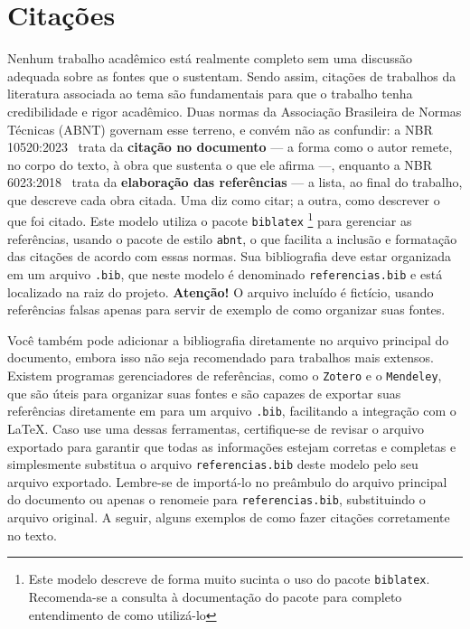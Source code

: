 \section{Citações}\label{sec:citacoes}

Nenhum trabalho acadêmico está realmente completo sem uma discussão adequada sobre as fontes que o
sustentam. Sendo assim, citações de trabalhos da literatura associada ao tema são fundamentais para
que o trabalho tenha credibilidade e rigor acadêmico. Duas normas da Associação Brasileira de Normas
Técnicas (ABNT) governam esse terreno, e convém não as confundir: a NBR
10520:2023~\cite{nbr10520:2023} trata da \textbf{citação no documento} --- a forma como o autor
remete, no corpo do texto, à obra que sustenta o que ele afirma ---, enquanto a NBR
6023:2018~\cite{nbr6023:2018} trata da \textbf{elaboração das referências} --- a lista, ao final do
trabalho, que descreve cada obra citada. Uma diz como citar; a outra, como descrever o que foi
citado. Este modelo utiliza o pacote \texttt{biblatex}%
%
\footnote{Este modelo descreve de forma muito sucinta o uso do pacote \texttt{biblatex}.
    Recomenda-se a consulta à documentação do pacote para completo entendimento de como utilizá-lo}%
%
 para gerenciar as referências, usando o pacote de estilo \texttt{abnt}, o que facilita a inclusão e
formatação das citações de acordo com essas normas. Sua bibliografia deve estar organizada em um
arquivo \texttt{.bib}, que neste modelo é denominado \texttt{referencias.bib} e está localizado na
raiz do projeto. \textbf{Atenção!}  O arquivo incluído é fictício, usando referências falsas apenas
para servir de exemplo de como organizar suas fontes.

Você também pode adicionar a bibliografia diretamente no arquivo principal do
documento, embora isso não seja recomendado para trabalhos mais extensos. Existem programas
gerenciadores de referências, como o \texttt{Zotero} e o \texttt{Mendeley}, que são úteis para
organizar suas fontes e são capazes de exportar suas referências diretamente em para um arquivo
\texttt{.bib}, facilitando a integração com o \LaTeX. Caso use uma dessas ferramentas, certifique-se
de revisar o arquivo exportado para garantir que todas as informações estejam corretas e completas e
simplesmente substitua o arquivo \texttt{referencias.bib} deste modelo pelo seu arquivo exportado.
Lembre-se de importá-lo no preâmbulo do arquivo principal do documento ou apenas o renomeie para
\texttt{referencias.bib}, substituindo o arquivo original. A seguir, alguns exemplos de como fazer citações corretamente no texto.

